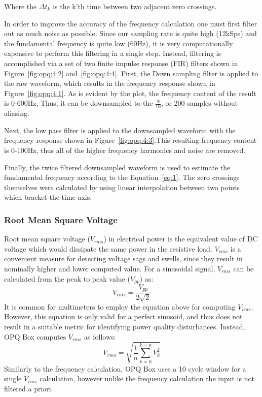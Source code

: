 Where the $\Delta t_{k}$ is the k'th time between two adjacent zero crossings.

In order to improve the accuracy of the frequency calculation one must first filter out as much noise as possible.
Since our sampling rate is quite high (12kSps) and the fundamental frequency is quite low (60Hz), it is very computationally expensive to perform this filtering in a single step.
Instead, filtering is accomplished via a set of two finite impulse response (FIR) filters shown in Figure~\ref{fig:opq:4:2} and~\ref{fig:opq:4:4}.
First, the Down sampling filter is applied to the raw waveform, which results in the frequency response shown in Figure~\ref{fig:opq:4:1}.
As is evident by the plot, the frequency content of the result is 0-600Hz, Thus, it can be downsampled to the $\frac{N}{10}$, or 200 samples without aliasing.

Next, the low pass filter is applied to the downsampled waveform with the frequency response shown in Figure~\ref{fig:opq:4:3}.This resulting frequency content is 0-100Hz, thus all of the higher frequency harmonics and noise are removed.

Finally, the twice filtered downsampled waveform is used to estimate the fundamental frequency according to the Equation~\ref{eq:1}.
The zero crossings themselves were calculated by using linear interpolation between two points which bracket the time axis.

\subsubsection{Root Mean Square Voltage}\label{subsec:root-mean-square-voltage}

Root mean square voltage ($V_{rms}$) in electrical power is the equivalent value of DC voltage which would dissipate the same power in the resistive load. $V_{rms}$ is a convenient measure for detecting voltage sags and swells, since they result in nominally higher and lower computed value.
For a sinusoidal signal, $V_{rms}$ can be calculated from the peak to peak value ($V_{pp}$) as:
\begin{equation} \label{eq:2}
	V_{rms} = \frac{V_{pp}}{2\sqrt{2}}
\end{equation}
It is common for multimeters to employ the equation above for computing $V_{rms}$.
However, this equation is only valid for a perfect sinusoid, and thus does not result in a suitable metric for identifying power quality disturbances.
Instead, OPQ Box computes $V_{rms}$ as follows:
\begin{equation} \label{eq:3}
	V_{rms} = \sqrt{\frac{1}{n}\sum\limits_{k=0}^{k=n}V_{k}^{2}}
\end{equation}
Similarly to the frequency calculation, OPQ Box uses a 10 cycle window for a single $V_{rms}$ calculation, however unlike the frequency calculation the input is not filtered a priori.

